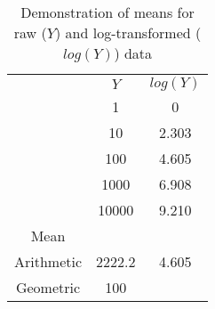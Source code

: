 \begin{table}[h]
  \centering
  \caption{Demonstration of means for raw ($Y$) and log-transformed ($log(Y)$) data}\label{tab:SLRTransformDemo}
    \begin{tabular}{ccc}
       & $Y$ & $log(Y)$ \\
      \cline{2-3}
       & 1 & 0 \\
       & 10 & 2.303 \\
       & 100 & 4.605 \\
       & 1000 & 6.908 \\
       & 10000 & 9.210 \\
      \cline{2-3}
      Mean &  &  \\
      \cline{1-1}
      Arithmetic & 2222.2 & 4.605 \\
      Geometric & 100 &  \\
    \end{tabular}
\end{table}




